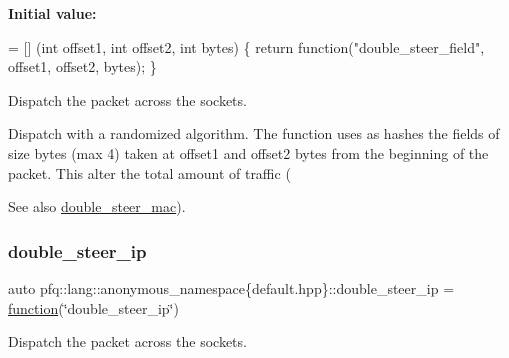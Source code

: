 {\bfseries Initial value\+:}
\begin{DoxyCode}
= [] (\textcolor{keywordtype}{int} offset1, \textcolor{keywordtype}{int} offset2, \textcolor{keywordtype}{int} bytes) \{
                                \textcolor{keywordflow}{return} \textcolor{keyword}{function}(\textcolor{stringliteral}{"double\_steer\_field"}, offset1, offset2, bytes);
                           \}
\end{DoxyCode}


Dispatch the packet across the sockets. 

Dispatch with a randomized algorithm. The function uses as hashes the fields of {\ttfamily size} bytes (max 4) taken at {\ttfamily offset1} and {\ttfamily offset2} bytes from the beginning of the packet. This alter the total amount of traffic (\begin{DoxySeeAlso}{See also}
\hyperlink{namespacepfq_1_1lang_1_1anonymous__namespace_02default_8hpp_03_a122b03580c609d71ca622ef9b15fa78d}{double\+\_\+steer\+\_\+mac}). 
\end{DoxySeeAlso}
\mbox{\label{namespacepfq_1_1lang_1_1anonymous__namespace_02default_8hpp_03_aaea5fb1d1914a1b01e52d8634b095eb6}} 
\subsubsection{\texorpdfstring{double\+\_\+steer\+\_\+ip}{double\_steer\_ip}}
{\footnotesize\ttfamily auto pfq\+::lang\+::anonymous\+\_\+namespace\{default.\+hpp\}\+::double\+\_\+steer\+\_\+ip = \hyperlink{namespacepfq_1_1lang_a1a4638059d700ae08d0ca63886ff2bb3}{function}(\char`\"{}double\+\_\+steer\+\_\+ip\char`\"{})}



Dispatch the packet across the sockets. 

